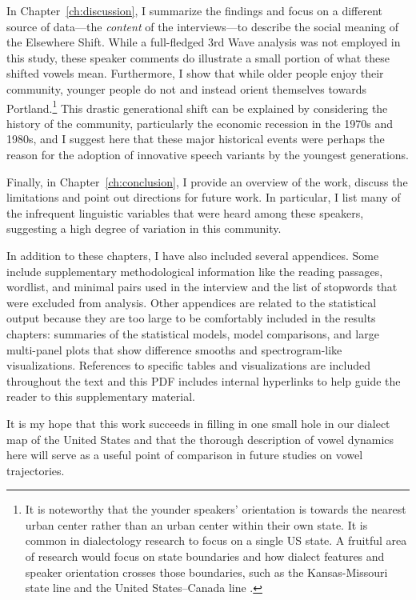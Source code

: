 In Chapter~\ref{ch:discussion}, I summarize the findings and focus on a different source of data---the \textit{content} of the interviews---to describe the social meaning of the Elsewhere Shift. While a full-fledged 3rd Wave \citep{eckert_2012} analysis was not employed in this study, these speaker comments do illustrate a small portion of what these shifted vowels mean. Furthermore, I show that while older people enjoy their community, younger people do not and instead orient themselves towards Portland.\footnote{It is noteworthy that the younder speakers' orientation is towards the nearest urban center rather than an urban center within their own state. It is common in dialectology research to focus on a single US state. A fruitful area of research would focus on state boundaries and how dialect features and speaker orientation crosses those boundaries, such as the Kansas-Missouri state line \citet{strelluf_2019} and the United States--Canada line \citet{swan_2016_diss}.} This drastic generational shift can be explained by considering the history of the community, particularly the economic recession in the 1970s and 1980s, and I suggest here that these major historical events were perhaps the reason for the adoption of innovative speech variants by the youngest generations.


Finally, in Chapter~\ref{ch:conclusion}, I provide an overview of the work, discuss the limitations and point out directions for future work. In particular, I list many of the infrequent linguistic variables that were heard among these speakers, suggesting a high degree of variation in this community.

In addition to these chapters, I have also included several appendices. Some include supplementary methodological information like the reading passages, wordlist, and minimal pairs used in the interview and the list of stopwords that were excluded from analysis. Other appendices are related to the statistical output because they are too large to be comfortably included in the results chapters: summaries of the statistical models, model comparisons, and large multi-panel plots that show difference smooths and spectrogram-like visualizations. References to specific tables and visualizations are included throughout the text and this PDF includes internal hyperlinks to help guide the reader to this supplementary material.

It is my hope that this work succeeds in filling in one small hole in our dialect map of the United States and that the thorough description of vowel dynamics here will serve as a useful point of comparison in future studies on vowel trajectories.
